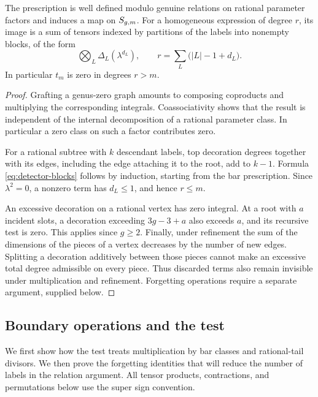 \begin{lemma}
\label{lem:detector-cutoff}
The prescription is well defined modulo genuine relations on
rational parameter factors and induces a map on \(S_{g,m}\).
For a homogeneous expression of degree \(r\), its image is a sum
of tensors indexed by partitions of the labels into nonempty
blocks, of the form
\begin{equation}
 \bigotimes_{L}\Delta_L(\lambda^{d_L}),
 \qquad
 r=\sum_L\bigl(|L|-1+d_L\bigr).
 \label{eq:detector-blocks}
\end{equation}
In particular \(t_m\) is zero in degrees \(r>m\).
\end{lemma}

\begin{proof}
Grafting a genus-zero graph amounts to composing coproducts and
multiplying the corresponding integrals.  Coassociativity shows
that the result is independent of the internal decomposition of
a rational parameter class.  In particular a zero class on such
a factor contributes zero.

For a rational subtree with \(k\) descendant labels, top
decoration degrees together with its edges, including the edge
attaching it to the root, add to \(k-1\).  Formula \eqref{eq:detector-blocks} follows by
induction, starting from the bar prescription.  Since
\(\lambda^2=0\), a nonzero term has \(d_L\leq1\), and hence \(r\leq m\).

An excessive decoration on a rational vertex has zero integral.
At a root with \(a\) incident slots, a decoration exceeding
\(3g-3+a\) also exceeds \(a\), and its recursive test is zero.
This applies since \(g\geq2\).  Finally, under refinement the sum
of the dimensions of the pieces of a vertex decreases by the
number of new edges.  Splitting a decoration additively between
those pieces cannot make an excessive total degree admissible
on every piece.  Thus discarded terms also remain invisible
under multiplication and refinement.  Forgetting operations
require a separate argument, supplied below.
\end{proof}

\subsection{Boundary operations and the test}

We first show how the test treats multiplication by bar classes and
rational-tail divisors.  We then prove the forgetting identities
that will reduce the number of labels in the relation argument.
All tensor products, contractions, and permutations below use
the super sign convention.

